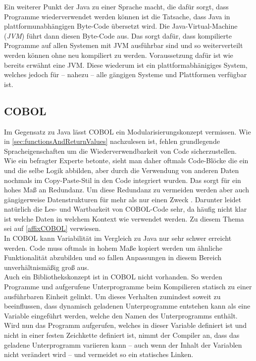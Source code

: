 Ein weiterer Punkt der Java zu einer Sprache macht, die dafür sorgt, dass Programme wiederverwendet werden können ist die Tatsache, dass Java in plattformunabhängigen Byte-Code übersetzt wird. Die Java-Virtual-Machine (\textit{JVM}) führt dann diesen Byte-Code aus. Das sorgt dafür, dass kompilierte Programme auf allen Systemen mit JVM ausführbar sind und so weiterverteilt werden können ohne neu kompiliert zu werden. Voraussetzung dafür ist wie bereits erwähnt eine JVM. Diese wiederum ist ein plattformabhänigiges System, welches jedoch für -- nahezu -- alle gängigen Systeme und Plattformen verfügbar ist.

\subsection*{COBOL}
Im Gegensatz zu Java lässt COBOL ein Modularisierungskonzept vermissen. Wie in \autoref{sec:functionsAndReturnValues} nachzulesen ist, fehlen grundlegende Spracheigenschaften um die Wiederverwendbarkeit von Code sicherzustellen. \\

Wie ein befragter Experte betonte, sieht man daher oftmals Code-Blöcke die ein und die selbe Logik abbilden, aber durch die Verwendung von anderen Daten nochmals im Copy-Paste-Stil in den Code integriert wurden. Das sorgt für ein hohes Maß an Redundanz. Um diese Redundanz zu vermeiden werden aber auch gängigerweise Datenstrukturen für mehr als nur einen Zweck . Darunter leidet natürlich die Les- und Wartbarkeit von COBOL-Code sehr, da häufig nicht klar ist welche Daten in welchem Kontext wie verwendet werden. Zu diesem Thema sei auf \autoref{affixCOBOL} verwiesen.\\

In COBOL kann Variabilität im Vergleich zu Java nur sehr schwer erreicht werden. Code muss oftmals in hohem Maße kopiert werden um ähnliche Funktionalität abzubilden und so fallen Anpassungen in diesem Bereich unverhältnismäßig groß aus.\\

Auch ein Bibliothekskonzept ist in COBOL nicht vorhanden. So werden Programme und aufgerufene Unterprogramme beim Kompilieren statisch zu einer ausführbaren Einheit gelinkt. Um dieses Verhalten zumindest soweit zu beeinflussen, dass dynamisch geladenen Unterprogramme entstehen kann als  eine Variable eingeführt werden, welche den Namen des Unterprogramms enthält. Wird nun das Programm aufgerufen, welches in dieser Variable definiert ist und nicht in einer festen Zeichkette definiert ist, nimmt der Compiler an, dass das geladene Unterprogramm variieren kann -- auch wenn der Inhalt der Variablen nicht verändert wird -- und vermeidet so ein statisches Linken.\\


